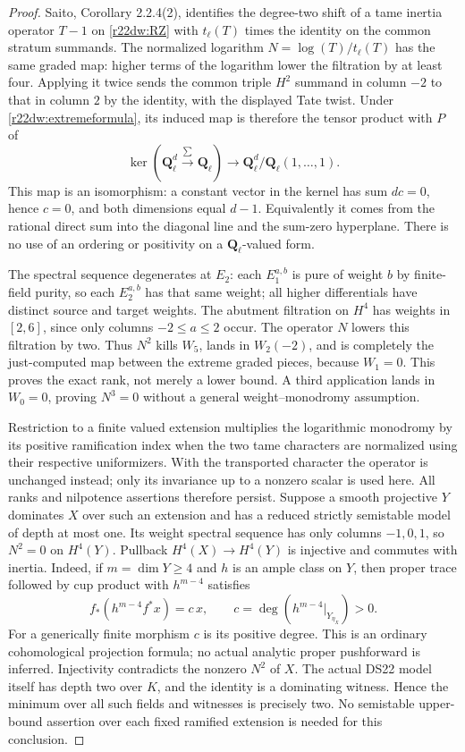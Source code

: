 \begin{proof}
Saito, Corollary 2.2.4(2), identifies the degree-two shift of a
tame inertia operator $T-1$ on \eqref{r22dw:RZ} with
$t_\ell(T)$ times the identity on the common stratum summands.
The normalized logarithm $N=\log(T)/t_\ell(T)$ has the same
graded map: higher terms of the logarithm lower the filtration
by at least four.  Applying it twice sends the common triple
$H^2$ summand in column $-2$ to that in column $2$ by the
identity, with the displayed Tate twist.  Under
\eqref{r22dw:extremeformula}, its induced map is therefore the
tensor product with $P$ of
\[
 \ker(\mathbf Q_\ell^d\xrightarrow{\sum}\mathbf Q_\ell)
       \longrightarrow\mathbf Q_\ell^d/\mathbf Q_\ell(1,\ldots,1).
 \tag{DW22.11}\label{r22dw:scalariso}
\]
This map is an isomorphism: a constant vector in the kernel has
sum $dc=0$, hence $c=0$, and both dimensions equal $d-1$.
Equivalently it comes from the rational direct sum into the
diagonal line and the sum-zero hyperplane.  There is no use of
an ordering or positivity on a $\mathbf Q_\ell$-valued form.

The spectral sequence degenerates at $E_2$: each $E_1^{a,b}$
is pure of weight $b$ by finite-field purity, so each $E_2^{a,b}$
has that same weight; all higher differentials have distinct
source and target weights.  The abutment filtration on $H^4$
has weights in $[2,6]$, since only columns $-2\le a\le2$
occur.  The operator $N$ lowers this filtration by two.
Thus $N^2$ kills $W_5$, lands in $W_2(-2)$, and is completely
the just-computed map between the extreme graded pieces,
because $W_1=0$.  This proves the exact rank, not merely a
lower bound.  A third application lands in $W_0=0$, proving
$N^3=0$ without a general weight--monodromy assumption.

Restriction to a finite valued extension multiplies the logarithmic
monodromy by its positive ramification index when the two tame
characters are normalized using their respective uniformizers.
With the transported character the operator is unchanged instead;
only its invariance up to a nonzero scalar is used here.  All ranks
and nilpotence assertions therefore persist.  Suppose a smooth
projective $Y$ dominates $X$ over such an extension and has a
reduced strictly semistable model of depth at most one.  Its weight
spectral sequence has only columns $-1,0,1$, so $N^2=0$ on
$H^4(Y)$.  Pullback $H^4(X)\to H^4(Y)$ is injective and commutes
with inertia.  Indeed, if $m=\dim Y\ge4$ and $h$ is an ample
class on $Y$, then proper trace followed by cup product with
$h^{m-4}$ satisfies
\[
 f_*(h^{m-4}f^*x)=c\,x,
 \qquad c=\deg(h^{m-4}|_{Y_{\eta_X}})>0.
 \tag{DW22.12}\label{r22dw:dominanttrace}
\]
For a generically finite morphism $c$ is its positive degree.
This is an ordinary cohomological projection formula; no actual
analytic proper pushforward is inferred.  Injectivity contradicts
the nonzero $N^2$ of $X$.  The actual DS22 model itself has depth
two over $K$, and the identity is a dominating witness.  Hence the
minimum over all such fields and witnesses is precisely two.
No semistable upper-bound assertion over each fixed ramified
extension is needed for this conclusion.
\end{proof}

